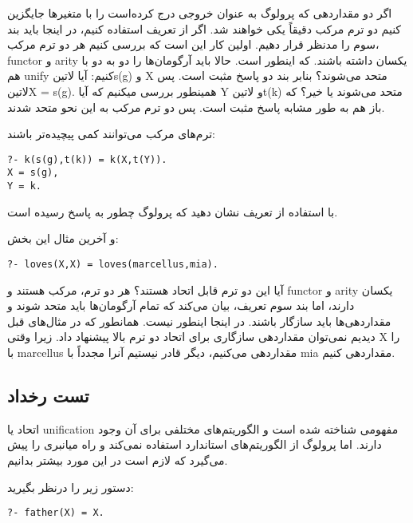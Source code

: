 اگر دو مقداردهی که پرولوگ به عنوان خروجی درج کرده‌است را با متغیرها جایگزین کنیم دو ترم مرکب دقیقاً یکی خواهند شد. اگر از تعریف استفاده کنیم، در اینجا باید بند سوم را مدنظر قرار دهیم. اولین کار این است که بررسی کنیم هر دو ترم مرکب، functor و arity یکسان داشته باشند. که اینطور است. حالا باید آرگومان‌ها را دو به دو با هم unify کنیم: آیا ‌لاتین{s(g)} و X متحد می‌شوند؟ بنابر بند دو پاسخ مثبت است. پس ‌لاتین{X = s(g)}. همینطور بررسی میکنیم که آیا Y و ‌لاتین{t(k)} متحد می‌شوند یا خیر؟ که باز هم به طور مشابه پاسخ مثبت است. پس دو ترم مرکب به این نحو متحد شدند.

ترم‌های مرکب می‌توانند کمی پیچیده‌تر باشند:
\begin{latin}
\begin{lstlisting}
?- k(s(g),t(k)) = k(X,t(Y)).
X = s(g),
Y = k.
\end{lstlisting}
\end{latin}

با استفاده از تعریف نشان دهید که پرولوگ چطور به پاسخ رسیده است.

و آخرین مثال این بخش:

\begin{latin}
\begin{lstlisting}
?- loves(X,X) = loves(marcellus,mia).
\end{lstlisting}
\end{latin}

آیا این دو ترم قابل اتحاد هستند؟ هر دو ترم، مرکب هستند و functor و arity یکسان دارند، اما بند سوم تعریف، بیان می‌کند که تمام آرگومان‌ها باید متحد شوند و مقداردهی‌ها باید سازگار باشند. در اینجا اینطور نیست. همانطور که در مثال‌های قبل دیدیم نمی‌توان مقداردهی سازگاری برای اتحاد دو ترم بالا پیشنهاد داد. زیرا وقتی X را با marcellus مقداردهی می‌کنیم، دیگر قادر نیستیم آنرا مجدداً با mia مقداردهی کنیم.

\subsection{تست رخداد}

اتحاد یا unification مفهومی شناخته شده است و الگوریتم‌های مختلفی برای آن وجود دارند. اما پرولوگ از الگوریتم‌های استاندارد استفاده نمی‌کند و راه میانبری را پیش می‌گیرد که لازم است در این مورد بیشتر بدانیم.

دستور زیر را درنظر بگیرید:

\begin{latin}
\begin{lstlisting}
?- father(X) = X.
\end{lstlisting}
\end{latin}


